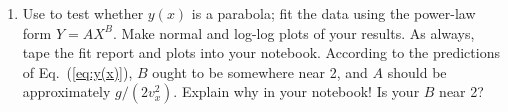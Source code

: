 \begin{enumerate}
%
%
%
%
%
%
%

\item Use \WAPP to test whether $y(x)$ is a parabola; fit the data using
the power-law form $Y = AX^{B}$.  
Make normal and log-log plots of your results.  As always, tape the
fit report and plots into your notebook.
According to the predictions of Eq.~(\ref{eq:y(x)}),  $B$ ought to be somewhere near
2, and $A$ should be approximately $g/(2v_{x}^{2})$.  Explain why in your notebook!
Is your $B$ near 2?


\end{enumerate}
